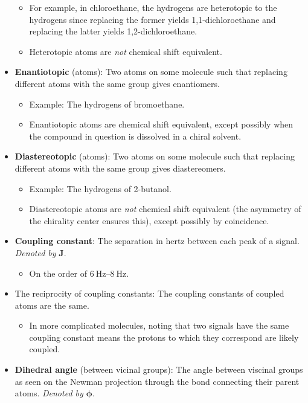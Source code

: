 \documentclass[../notes.tex]{subfiles}
\begin{document}
\begin{itemize}
    \begin{itemize}
        \item For example, in chloroethane, the  hydrogens are heterotopic to the  hydrogens since replacing the former yields 1,1-dichloroethane and replacing the latter yields 1,2-dichloroethane.
        \item Heterotopic atoms are \emph{not} chemical shift equivalent.
    \end{itemize}
    \item \textbf{Enantiotopic} (atoms): Two atoms on some molecule such that replacing different atoms with the same group gives enantiomers.
    \begin{itemize}
        \item Example: The  hydrogens of bromoethane.
        \item Enantiotopic atoms are chemical shift equivalent, except possibly when the compound in question is dissolved in a chiral solvent.
    \end{itemize}
    \item \textbf{Diastereotopic} (atoms): Two atoms on some molecule such that replacing different atoms with the same group gives diastereomers.
    \begin{itemize}
        \item Example: The  hydrogens of 2-butanol.
        \item Diastereotopic atoms are \emph{not} chemical shift equivalent (the asymmetry of the chirality center ensures this), except possibly by coincidence.
    \end{itemize}
    \item \textbf{Coupling constant}: The separation in hertz between each peak of a signal. \emph{Denoted by} $\bm{J}$.
    \begin{itemize}
        \item On the order of $\SIrange{6}{8}{\hertz}$.
    \end{itemize}
    \item The reciprocity of coupling constants: The coupling constants of coupled atoms are the same.
    \begin{itemize}
        \item In more complicated molecules, noting that two signals have the same coupling constant means the protons to which they correspond are likely coupled.
    \end{itemize}
    \item \textbf{Dihedral angle} (between vicinal groups): The angle between viscinal groups as seen on the Newman projection through the bond connecting their parent atoms. \emph{Denoted by} $\bm{\phi}$.

\end{itemize}
\end{document}
